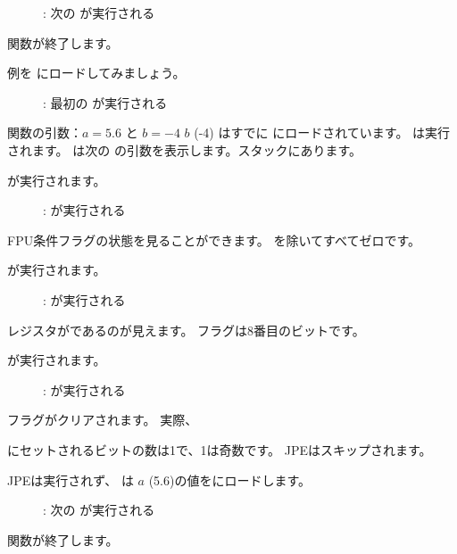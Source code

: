 \begin{figure}[H]
\centering
{}
\caption{\olly: 次の \FLD が実行される}
\label{fig:FPU_comparison_case1_olly5}
\end{figure}

関数が終了します。

\clearpage
{}

例を \olly にロードしてみましょう。

\begin{figure}[H]
\centering
{}
\caption{\olly: 最初の \FLD が実行される}
\label{fig:FPU_comparison_case2_olly1}
\end{figure}

関数の引数：$a=5.6$ と $b=-4$
$b$ (-4) はすでに にロードされています。
\FCOMP は実行されます。
\olly は次の \FCOMP の引数を表示します。スタックにあります。

\clearpage
\FCOMP が実行されます。

\begin{figure}[H]
\centering
{}
\caption{\olly: \FCOMP が実行される}
\label{fig:FPU_comparison_case2_olly2}
\end{figure}

\ac{FPU}条件フラグの状態を見ることができます。 \Czero を除いてすべてゼロです。

\clearpage
\FNSTSW が実行されます。

\begin{figure}[H]
\centering
{}
\caption{\olly: \FNSTSW が実行される}
\label{fig:FPU_comparison_case2_olly3}
\end{figure}

レジスタがであるのが見えます。 \Czero フラグは8番目のビットです。

\clearpage
\TEST が実行されます。

\begin{figure}[H]
\centering
{}
\caption{\olly: \TEST が実行される}
\label{fig:FPU_comparison_case2_olly4}
\end{figure}

フラグがクリアされます。
実際、

にセットされるビットの数は1で、1は奇数です。
\ac{JPE}はスキップされます。

\clearpage
\ac{JPE}は実行されず、 \FLD は $a$ (5.6)の値をにロードします。

\begin{figure}[H]
\centering
{}
\caption{\olly: 次の \FLD が実行される}
\label{fig:FPU_comparison_case2_olly5}
\end{figure}

関数が終了します。
